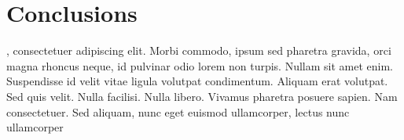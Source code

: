 
\chapter{Conclusions}\label{ch:conclusions} 

, consectetuer adipiscing elit. Morbi commodo, ipsum sed pharetra gravida, orci magna rhoncus neque, id pulvinar odio lorem non turpis. Nullam sit amet enim. Suspendisse id velit vitae ligula volutpat condimentum. Aliquam erat volutpat. Sed quis velit. Nulla facilisi. Nulla libero. Vivamus pharetra posuere sapien. Nam consectetuer. Sed aliquam, nunc eget euismod ullamcorper, lectus nunc ullamcorper 

